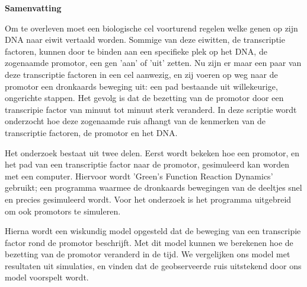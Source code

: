 \begin{center}
{\center \bf Samenvatting}
\end{center}

Om te overleven moet een biologische cel voorturend regelen welke genen op zijn DNA naar eiwit vertaald worden. Sommige van deze eiwitten, de transcriptie factoren, kunnen door te binden aan een specifieke plek op het DNA, de zogenaamde promotor, een gen 'aan' of 'uit' zetten. Nu zijn er maar een paar van deze transcriptie factoren in een cel aanwezig, en zij voeren op weg naar de promotor een dronkaards beweging uit: een pad bestaande uit willekeurige, ongerichte stappen. Het gevolg is dat de bezetting van de promotor door een transcripie factor van minuut tot minuut sterk veranderd.  In deze scriptie wordt onderzocht hoe deze zogenaamde ruis afhangt van de kenmerken van de transcriptie factoren, de promotor en het DNA. 

Het onderzoek bestaat uit twee delen. Eerst wordt bekeken hoe een promotor,  en het pad van een transcriptie factor naar de promotor, gesimuleerd kan worden met een computer. Hiervoor wordt 'Green's Function Reaction Dynamics' gebruikt; een programma waarmee de dronkaards bewegingen van de deeltjes snel en precies gesimuleerd wordt. Voor het onderzoek is het programma uitgebreid om ook promotors te simuleren. 

Hierna wordt een wiskundig model opgesteld dat de beweging van een transcripie factor rond de promotor beschrijft. Met dit model kunnen we  berekenen hoe de bezetting van de promotor veranderd in de tijd. We vergelijken ons model met resultaten uit simulaties, en vinden dat de geobserveerde ruis uitstekend door ons model voorspelt wordt.